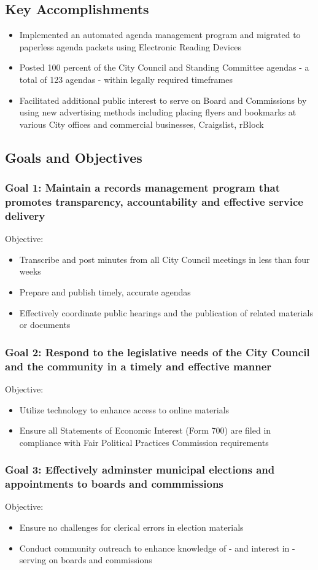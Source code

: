 \subsection{Key Accomplishments}
\begin{itemize}
\checkl
\item Implemented an automated agenda management program and migrated to paperless agenda packets using Electronic Reading Devices
\item Posted 100 percent of the City Council and Standing Committee agendas - a total of 123 agendas - within legally required timeframes
\item Facilitated additional public interest to serve on Board and Commissions by using new advertising methods including placing flyers and bookmarks at various City offices and commercial businesses, Craigslist, rBlock
\end{itemize}
\newpage\subsection{Goals and Objectives}
\subsubsection{Goal 1: Maintain a records management program that promotes transparency, accountability and effective service delivery}
Objective:
\begin{itemize}
\bulletl
\item Transcribe and post minutes from all City Council meetings in less than four weeks
\item Prepare and publish timely, accurate agendas
\item Effectively coordinate public hearings and the publication of related materials or documents
\end{itemize}
\subsubsection{Goal 2: Respond to the legislative needs of the City Council and the community in a timely and effective manner}
Objective:
\begin{itemize}
\bulletl
\item Utilize technology to enhance access to online materials
\item Ensure all Statements of Economic Interest (Form 700) are filed in compliance with Fair Political Practices Commission requirements
\end{itemize}
\subsubsection{Goal 3: Effectively adminster municipal elections and appointments to boards and commmissions}
Objective:
\begin{itemize}
\bulletl
\item Ensure no challenges for clerical errors in election materials
\item Conduct community outreach to enhance knowledge of - and interest in - serving on boards and commissions
\end{itemize}
